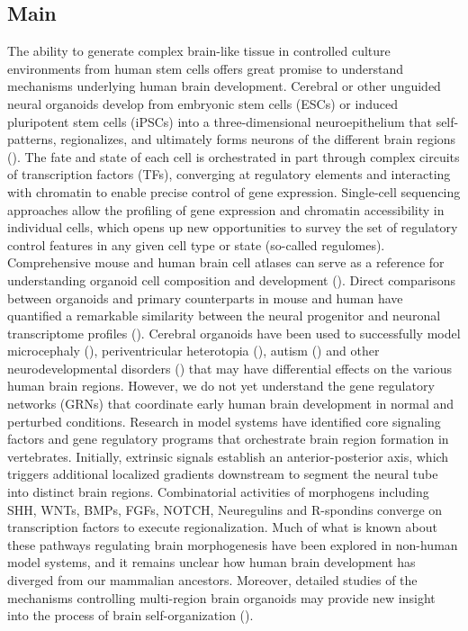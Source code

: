 \subsection{Main}

The ability to generate complex brain-like tissue in controlled culture environments from human stem cells offers great promise to understand mechanisms underlying human brain development. Cerebral or other unguided neural organoids develop from embryonic stem cells (ESCs) or induced pluripotent stem cells (iPSCs) into a three-dimensional neuroepithelium that self-patterns, regionalizes, and ultimately forms neurons of the different brain regions (\cite{eiraku_self-organizing_2011,lancaster_cerebral_2013,mariani_modeling_2012}). The fate and state of each cell is orchestrated in part through complex circuits of transcription factors (TFs), converging at regulatory elements and interacting with chromatin to enable precise control of gene expression. Single-cell sequencing approaches allow the profiling of gene expression and chromatin accessibility in individual cells, which opens up new opportunities to survey the set of regulatory control features in any given cell type or state (so-called regulomes). Comprehensive mouse and human brain cell atlases can serve as a reference for understanding organoid cell composition and development (\cite{nowakowski_spatiotemporal_2017,trevino_chromatin_2020,la_manno_molecular_2021}). Direct comparisons between organoids and primary counterparts in mouse and human have quantified a remarkable similarity between the neural progenitor and neuronal transcriptome profiles (\cite{camp_human_2015,fleck_resolving_2021,pollen_establishing_2019}). Cerebral organoids have been used to successfully model microcephaly (\cite{lancaster_cerebral_2013}), periventricular heterotopia (\cite{klaus_altered_2019}), autism (\cite{mariani_foxg1-dependent_2015}) and other neurodevelopmental disorders (\cite{klingler_mapping_2021,di_lullo_use_2017}) that may have differential effects on the various human brain regions. However, we do not yet understand the gene regulatory networks (GRNs) that coordinate early human brain development in normal and perturbed conditions.
Research in model systems have identified core signaling factors and gene regulatory programs that orchestrate brain region formation in vertebrates. Initially, extrinsic signals establish an anterior-posterior axis, which triggers additional localized gradients downstream to segment the neural tube into distinct brain regions. Combinatorial activities of morphogens including SHH, WNTs, BMPs, FGFs, NOTCH, Neuregulins and R-spondins converge on transcription factors to execute regionalization. Much of what is known about these pathways regulating brain morphogenesis have been explored in non-human model systems, and it remains unclear how human brain development has diverged from our mammalian ancestors. Moreover, detailed studies of the mechanisms controlling multi-region brain organoids may provide new insight into the process of brain self-organization (\cite{biesecker_greig_2008}).
